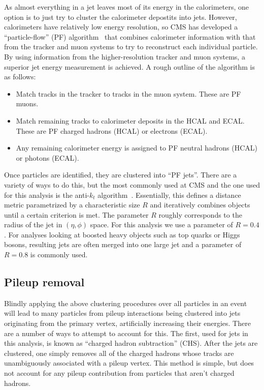 As almost everything in a jet leaves
most of its energy in the calorimeters, 
one option is to just try to cluster the
calorimeter depostits into jets. However, calorimeters
have relatively low energy resolution, so CMS has developed
a ``particle-flow'' (PF) algorithm~\cite{CMS:pf} that combines calorimeter
information with that from the tracker and muon systems
to try to reconstruct each individual particle.
By using information from the higher-resolution tracker
and muon systems, a superior jet energy measurement is achieved.
A rough outline of the algorithm is as follows:
\begin{itemize}\setlength\itemsep{-1mm}
\item Match tracks in the tracker to tracks in the muon system.
These are PF muons.
\item Match remaining tracks to calorimeter deposits in the HCAL
and ECAL. These are PF charged hadrons (HCAL) or electrons (ECAL).
\item Any remaining calorimeter energy is assigned to 
PF neutral hadrons (HCAL) or photons (ECAL).
\end{itemize}

Once particles are identified, they are clustered into ``PF jets''.
There are a variety of ways to do this, but the most commonly used
at CMS and the one used for this analysis is the anti-$k_t$
algorithm~\cite{Cacciari:antikt}. Essentially, this defines a distance metric
parametrized by a characteristic size $R$ and iteratively combines objects
until a certain criterion is met. The parameter $R$ roughly corresponds
to the radius of the jet in $(\eta,\phi)$ space. For this analysis we use
a parameter of $R=0.4$. For analyses looking at boosted heavy objects
such as top quarks or Higgs bosons, resulting jets are often merged
into one large jet and a parameter of $R=0.8$ is commonly used.

\subsection{Pileup removal}
Blindly applying the above clustering procedures
over all particles in an event will lead to many particles from
pileup interactions being clustered into jets originating from
the primary vertex, artificially increasing their energies.
There are a number of ways to attempt to account for this.
The first, used for jets in this analysis, is known
as ``charged hadron subtraction'' (CHS). After the jets
are clustered, one simply removes all of the charged hadrons
whose tracks are unambiguously associated with a pileup vertex.
This method is simple, but does not account for any pileup contribution
from particles that aren't charged hadrons.

